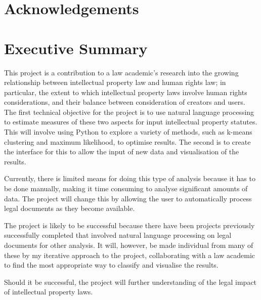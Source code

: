 \section*{Acknowledgements}
	\newpage
	
\section*{Executive Summary}	
	This project is a contribution to a law academic’s research into the growing relationship between intellectual 	property law and human rights law; in particular, the extent to which intellectual property laws involve human rights considerations, and their balance between consideration of creators and users. The first technical objective for the project is to use natural language processing to estimate measures of these two aspects for input intellectual property statutes. This will involve using Python to explore a variety of methods, such as k-means clustering and maximum likelihood, to optimise results. The second is to create the interface for this to allow the input of new data and visualisation of the results. 

Currently, there is limited means for doing this type of analysis because it has to be done manually, making it time consuming to analyse significant amounts of data. The project will change this by allowing the user to automatically process legal documents as they become available.  

The project is likely to be successful because there have been projects previously successfully completed that involved natural language processing on legal documents for other analysis. It will, however, be made individual from many of these by my iterative approach to the project, collaborating with a law academic to find the most appropriate way to classify and visualise the results. 

Should it be successful, the project will further understanding of the legal impact of intellectual property laws. 

\tableofcontents